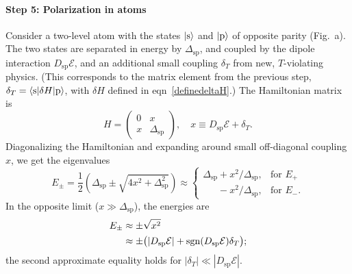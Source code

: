 \paragraph{Step 5: Polarization in atoms}

Consider a two-level atom with the states $|\text{s}\rangle$ and $|\text{p}\rangle$
of opposite parity (Fig.~a). The two states are separated in
energy by $\Delta_\text{sp}$, and coupled by the dipole interaction
$D_\text{sp}\mathcal{E}$, and an additional small coupling $\delta_T$ from new,
$T$-violating physics. (This corresponds to the matrix element from the previous
step, $\delta_T=\langle\text{s}|\delta H|\text{p}\rangle$, with $\delta H$ defined
in eqn~\ref{definedeltaH}.) The Hamiltonian matrix is
%
\begin{equation}
    \label{polarizetoy}
H=\begin{pmatrix}
    0 & x \\
    x & \Delta_\text{sp}
\end{pmatrix},
\quad
x\equiv D_\text{sp}\mathcal{E}+\delta_T.
\end{equation}
%
Diagonalizing the Hamiltonian and expanding around small off-diagonal coupling
$x$, we get the eigenvalues
%
\[
E_\pm=\frac{1}{2}\left(
\Delta_\text{sp}\pm\sqrt{4x^2+\Delta_\text{sp}^2}
\right)
\approx\begin{cases}
    \Delta_\text{sp}+x^2/\Delta_\text{sp},&\text{for $E_+$} \\
    \phantom{\Delta_\text{sp}}-x^2/\Delta_\text{sp},&\text{for $E_-$.}
\end{cases}
\]
%
In the opposite limit ($x\gg\Delta_\text{sp}$), the energies are
%
\begin{equation}
\begin{aligned}
    \label{Elargex}
    E_\pm&\approx
    \pm\sqrt{x^2}\\
    &\approx
    \pm\big(
        |D_\text{sp}\mathcal{E}|+\operatorname{sgn}(D_\text{sp}\mathcal{E})\delta_T
    \big);
\end{aligned}
\end{equation}
%
the second approximate equality holds for
$|\delta_T|\ll|D_\text{sp}\mathcal{E}|$.

